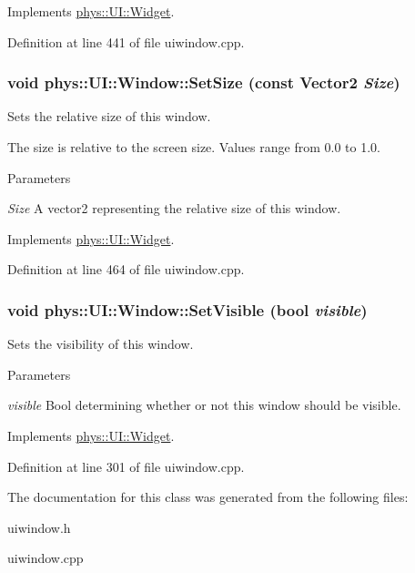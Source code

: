 Implements \hyperlink{classphys_1_1UI_1_1Widget_a3f1cd1ce55660c7de4859983bac1ab7c}{phys::UI::Widget}.



Definition at line 441 of file uiwindow.cpp.

\hypertarget{classphys_1_1UI_1_1Window_aeaf0b107e6bcf688635dd4719871bd9a}{
\subsubsection[{SetSize}]{\setlength{\rightskip}{0pt plus 5cm}void phys::UI::Window::SetSize (const {\bf Vector2} {\em Size})}}
\label{d4/d86/classphys_1_1UI_1_1Window_aeaf0b107e6bcf688635dd4719871bd9a}


Sets the relative size of this window. 

The size is relative to the screen size. Values range from 0.0 to 1.0. 
\begin{DoxyParams}{Parameters}
\item[{\em Size}]A vector2 representing the relative size of this window. \end{DoxyParams}


Implements \hyperlink{classphys_1_1UI_1_1Widget_a3fe0b767fea59e1d120ed37b26c99044}{phys::UI::Widget}.



Definition at line 464 of file uiwindow.cpp.

\hypertarget{classphys_1_1UI_1_1Window_a351439e78013bc87ecadcc00bce08573}{
\subsubsection[{SetVisible}]{\setlength{\rightskip}{0pt plus 5cm}void phys::UI::Window::SetVisible (bool {\em visible})}}
\label{d4/d86/classphys_1_1UI_1_1Window_a351439e78013bc87ecadcc00bce08573}


Sets the visibility of this window. 


\begin{DoxyParams}{Parameters}
\item[{\em visible}]Bool determining whether or not this window should be visible. \end{DoxyParams}


Implements \hyperlink{classphys_1_1UI_1_1Widget_ab049233d8d5522a6ab42654b8924a3e0}{phys::UI::Widget}.



Definition at line 301 of file uiwindow.cpp.



The documentation for this class was generated from the following files:\begin{DoxyCompactItemize}
\item 
uiwindow.h\item 
uiwindow.cpp\end{DoxyCompactItemize}
